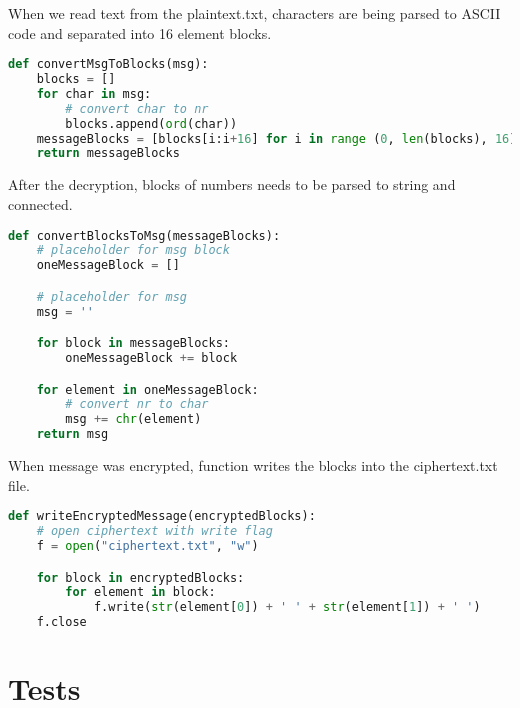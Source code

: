 \documentclass[a4paper,12pt]{article}
\begin{document}
When we read text from the plaintext.txt, characters are being parsed to ASCII code and separated into 16 element blocks.
\begin{lstlisting}[language=Python]
  def convertMsgToBlocks(msg):
    blocks = []
    for char in msg:
        # convert char to nr
        blocks.append(ord(char))
    messageBlocks = [blocks[i:i+16] for i in range (0, len(blocks), 16)]
    return messageBlocks  
\end{lstlisting}
After the decryption, blocks of numbers needs to be parsed to string and connected.
\begin{lstlisting}[language=Python]
  def convertBlocksToMsg(messageBlocks):
    # placeholder for msg block
    oneMessageBlock = []

    # placeholder for msg
    msg = ''

    for block in messageBlocks:
        oneMessageBlock += block

    for element in oneMessageBlock:
        # convert nr to char
        msg += chr(element)
    return msg 
\end{lstlisting}
When message was encrypted, function writes the blocks into the ciphertext.txt file.
\begin{lstlisting}[language=Python]
  def writeEncryptedMessage(encryptedBlocks):
    # open ciphertext with write flag
    f = open("ciphertext.txt", "w")

    for block in encryptedBlocks:
        for element in block:
            f.write(str(element[0]) + ' ' + str(element[1]) + ' ')
    f.close
\end{lstlisting}

\section{Tests}
\end{document}

